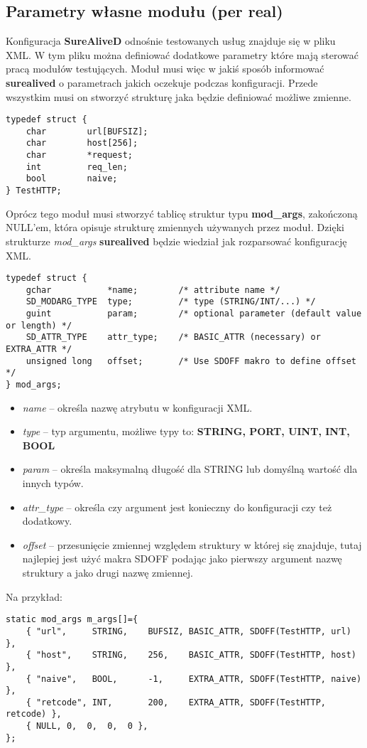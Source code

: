 \documentclass[polish,12pt]{article}
\begin{document}
\subsection{Parametry własne modułu (per real)}
Konfiguracja \textbf{SureAliveD} odnośnie testowanych usług znajduje się w pliku XML.
W tym pliku można definiować dodatkowe parametry które mają sterować pracą modułów testujących.
Moduł musi więc w jakiś sposób informować \textbf{surealived} o parametrach jakich oczekuje
podczas konfiguracji. Przede wszystkim musi on stworzyć strukturę jaka będzie definiować
możliwe zmienne.
{\small
\begin{verbatim}
typedef struct {
    char        url[BUFSIZ];
    char        host[256];
    char        *request;
    int         req_len;
    bool        naive;
} TestHTTP;
\end{verbatim}
}
\newpage
Oprócz tego moduł musi stworzyć tablicę struktur typu \textbf{mod\_args}, zakończoną NULL'em,
która opisuje strukturę zmiennych używanych przez moduł. Dzięki strukturze \textit{mod\_args}
\textbf{surealived} będzie wiedział jak rozparsować konfigurację XML.
{\small
\begin{verbatim}
typedef struct {
    gchar           *name;        /* attribute name */
    SD_MODARG_TYPE  type;         /* type (STRING/INT/...) */
    guint           param;        /* optional parameter (default value or length) */
    SD_ATTR_TYPE    attr_type;    /* BASIC_ATTR (necessary) or EXTRA_ATTR */
    unsigned long   offset;       /* Use SDOFF makro to define offset */
} mod_args;
\end{verbatim}
}
\begin{itemize}
  \item \textit{name} -- określa nazwę atrybutu w konfiguracji XML.
  \item \textit{type} -- typ argumentu, możliwe typy to: \textbf{STRING, PORT, UINT, INT, BOOL}
  \item \textit{param} -- określa maksymalną długość dla STRING lub domyślną wartość dla innych typów.
  \item \textit{attr\_type} -- określa czy argument jest konieczny do konfiguracji czy też dodatkowy.
  \item \textit{offset} -- przesunięcie zmiennej względem struktury w której się znajduje, tutaj najlepiej
    jest użyć makra SDOFF podając jako pierwszy argument nazwę struktury a jako drugi nazwę zmiennej.
\end{itemize}
Na przykład:
{\small
\begin{verbatim}
static mod_args m_args[]={
    { "url",     STRING,    BUFSIZ, BASIC_ATTR, SDOFF(TestHTTP, url)     },
    { "host",    STRING,    256,    BASIC_ATTR, SDOFF(TestHTTP, host)    },
    { "naive",   BOOL,      -1,     EXTRA_ATTR, SDOFF(TestHTTP, naive)   },
    { "retcode", INT,       200,    EXTRA_ATTR, SDOFF(TestHTTP, retcode) },
    { NULL, 0,  0,  0,  0 },
};
\end{verbatim}
}
\end{document}
